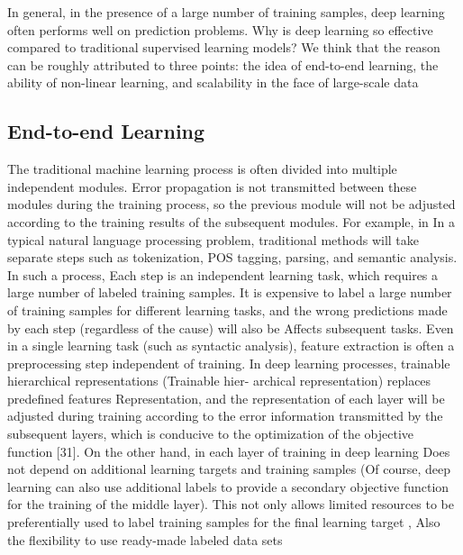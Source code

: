 \documentclass[11pt,en]{elegantpaper}
\begin{document}
In general, in the presence of a large number of training samples, deep learning often performs well on prediction problems. Why is deep learning so effective compared to traditional supervised learning models? We think that the reason can be roughly attributed to three points: the idea of ​​end-to-end learning, the ability of non-linear learning, and scalability in the face of large-scale data%

\subsection{End-to-end Learning}
The traditional machine learning process is often divided into multiple independent modules. Error propagation is not transmitted between these modules during the training process, so the previous module will not be adjusted according to the training results of the subsequent modules. For example, in In a typical natural language processing problem, traditional methods will take separate steps such as tokenization, POS tagging, parsing, and semantic analysis. In such a process, Each step is an independent learning task, which requires a large number of labeled training samples. It is expensive to label a large number of training samples for different learning tasks, and the wrong predictions made by each step (regardless of the cause) will also be Affects subsequent tasks. Even in a single learning task (such as syntactic analysis), feature extraction is often a preprocessing step independent of training. In deep learning processes, trainable hierarchical representations (Trainable hier- archical representation) replaces predefined features Representation, and the representation of each layer will be adjusted during training according to the error information transmitted by the subsequent layers, which is conducive to the optimization of the objective function [31]. On the other hand, in each layer of training in deep learning Does not depend on additional learning targets and training samples (Of course, deep learning can also use additional labels to provide a secondary objective function for the training of the middle layer). This not only allows limited resources to be preferentially used to label training samples for the final learning target , Also the flexibility to use ready-made labeled data sets
\end{document}
